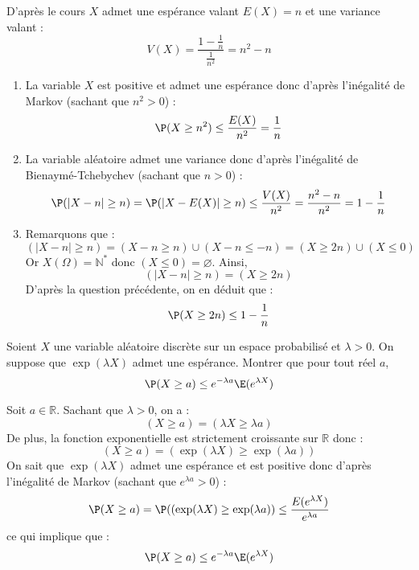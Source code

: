 \documentclass[a4paper,10pt]{report}
\begin{document}
\corr D'après le cours $X$ admet une espérance valant $E(X)=n$ et une variance valant :
$$ V(X) = \dfrac{1- \tfrac{1}{n}}{\tfrac{1}{n^2}} = n^2-n$$

\begin{enumerate}
\item La variable $X$ est positive et admet une espérance donc d'après l'inégalité de Markov (sachant que $n^2>0$) :
$$ \P(X \geq n^2) \leq \dfrac{E(X)}{n^2} = \dfrac{1}{n}$$
\item La variable aléatoire admet une variance donc d'après l'inégalité de Bienaymé-Tchebychev (sachant que $n>0$) :
$$ \P( \vert X- n \vert \geq n) =  \P( \vert X- E(X) \vert \geq n) \leq \dfrac{V(X)}{n^2} = \dfrac{n^2-n}{n^2} = 1 - \dfrac{1}{n}$$
\item Remarquons que :
$$ (\vert X- n \vert \geq n) = (X-n \geq n) \cup (X-n \leq -n) = (X \geq 2n) \cup (X \leq 0)$$
Or $X(\Omega)= \mathbb{N}^*$ donc $(X \leq 0) = \varnothing$. Ainsi,
$$ (\vert X- n \vert \geq n) = (X \geq 2n)$$
D'après la question précédente, on en déduit que :
$$\P(X \geq 2n) \leq 1 - \dfrac{1}{n} $$
\end{enumerate}

\begin{Exercice}{} Soient $X$ une variable aléatoire discrète sur un espace probabilisé et $\lambda >0$. On suppose que $\exp(\lambda X)$ admet une espérance. Montrer que pour tout réel $a$,
$$ \P(X \geq a) \leq e^{-\lambda a} \E(e^{\lambda X})$$
\end{Exercice}

\corr Soit $a \in \mathbb{R}$. Sachant que $\lambda>0$, on a :
$$ (X \geq a) = (\lambda X \geq \lambda a)$$
De plus, la fonction exponentielle est strictement croissante sur $\mathbb{R}$ donc :
$$ (X \geq a) = (\exp(\lambda X) \geq \exp(\lambda a))$$
On sait que $\exp(\lambda X)$ admet une espérance et est positive donc d'après l'inégalité de Markov (sachant que $e^{\lambda a}>0$) :
$$ \P(X \geq a) = \P((\exp(\lambda X) \geq \exp(\lambda a)) \leq \dfrac{E(e^{\lambda X})}{e^{\lambda a}}$$
ce qui implique que :
$$ \P(X \geq a) \leq e^{-\lambda a} \E(e^{\lambda X})$$
\end{document}
